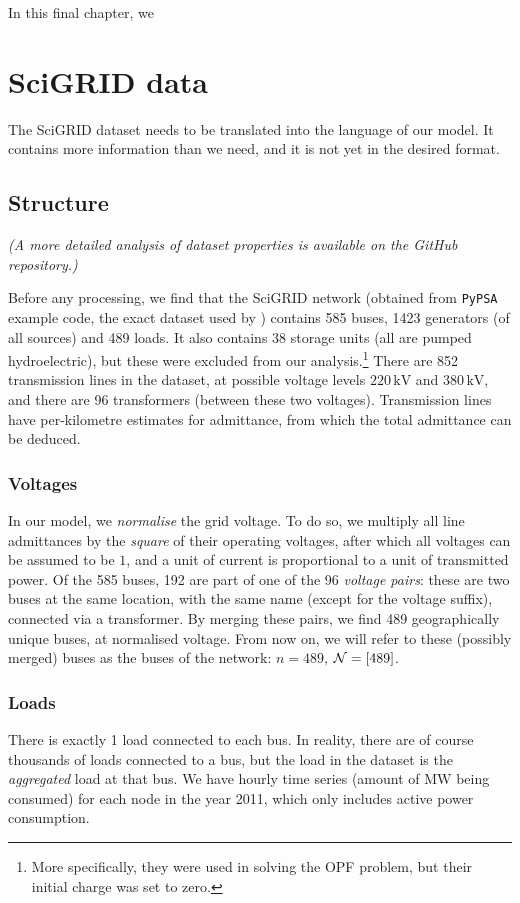 \documentclass[main.tex]{subfiles}
\begin{document}
In this final chapter, we 

\section{SciGRID data}
The SciGRID dataset needs to be translated into the language of our model. It contains more information than we need, and it is not yet in the desired format. 

\subsection{Structure}
\emph{(A more detailed analysis of dataset properties is available on the GitHub repository.)}

Before any processing, we find that the SciGRID network (obtained from \texttt{PyPSA} example code, the exact dataset used by \cite{Nesti2018emergentfailures}) contains 585 buses, 1423 generators (of all sources) and 489 loads. It also contains 38 storage units (all are pumped hydroelectric), but these were excluded from our analysis.\footnote{More specifically, they were used in solving the OPF problem, but their initial charge was set to zero.} There are 852 transmission lines in the dataset, at possible voltage levels $220 \, \si{\kilo\volt}$ and $380 \, \si{\kilo\volt}$, and there are 96 transformers (between these two voltages). Transmission lines have per-kilometre estimates for admittance, from which the total admittance can be deduced.

\subsubsection{Voltages}
In our model, we \emph{normalise} the grid voltage. To do so, we multiply all line admittances by the \emph{square} of their operating voltages, after which all voltages can be assumed to be $1$, and a unit of current is proportional to a unit of transmitted power. Of the 585 buses, 192 are part of one of the 96 \emph{voltage pairs}: these are two buses at the same location, with the same name (except for the voltage suffix), connected via a transformer. By merging these pairs, we find 489 geographically unique buses, at normalised voltage. From now on, we will refer to these (possibly merged) buses as the buses of the network: $n=489$, $\mathcal{N} = [489]$.

\subsubsection{Loads}
There is exactly 1 load connected to each bus. In reality, there are of course thousands of loads connected to a bus, but the load in the dataset is the \emph{aggregated} load at that bus. We have hourly time series (\ie amount of $\si{\mega\watt}$ being consumed) for each node in the year 2011, which only includes active power consumption.
\end{document}
